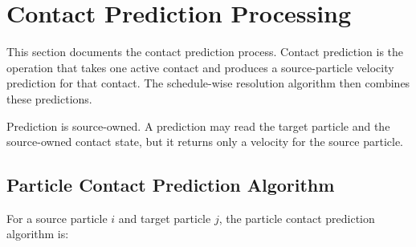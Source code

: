 \section{Contact Prediction Processing}

This section documents the contact prediction process. Contact prediction is
the operation that takes one active contact and produces a source-particle
velocity prediction for that contact. The schedule-wise resolution algorithm
then combines these predictions.

Prediction is source-owned. A prediction may read the target particle and the
source-owned contact state, but it returns only a velocity for the source
particle.

\subsection{Particle Contact Prediction Algorithm}

For a source particle \(i\) and target particle \(j\), the particle contact
prediction algorithm is:

